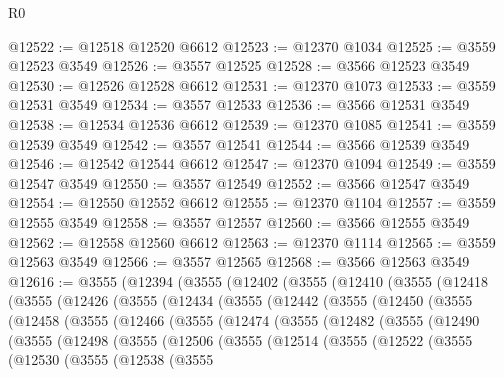 \begin{lexlean}{R0}
\begin{coremodule}
@12522 := @12518 @12520 @6612
@12523 := @12370 @1034
@12525 := @3559 @12523 @3549
@12526 := @3557 @12525
@12528 := @3566 @12523 @3549
@12530 := @12526 @12528 @6612
@12531 := @12370 @1073
@12533 := @3559 @12531 @3549
@12534 := @3557 @12533
@12536 := @3566 @12531 @3549
@12538 := @12534 @12536 @6612
@12539 := @12370 @1085
@12541 := @3559 @12539 @3549
@12542 := @3557 @12541
@12544 := @3566 @12539 @3549
@12546 := @12542 @12544 @6612
@12547 := @12370 @1094
@12549 := @3559 @12547 @3549
@12550 := @3557 @12549
@12552 := @3566 @12547 @3549
@12554 := @12550 @12552 @6612
@12555 := @12370 @1104
@12557 := @3559 @12555 @3549
@12558 := @3557 @12557
@12560 := @3566 @12555 @3549
@12562 := @12558 @12560 @6612
@12563 := @12370 @1114
@12565 := @3559 @12563 @3549
@12566 := @3557 @12565
@12568 := @3566 @12563 @3549
@12616 := @3555
    (@12394
      (@3555
        (@12402
          (@3555
            (@12410
              (@3555
                (@12418
                  (@3555
                    (@12426
                      (@3555
                        (@12434
                          (@3555
                            (@12442
                              (@3555
                                (@12450
                                  (@3555
                                    (@12458
                                      (@3555
                                        (@12466
                                          (@3555
                                            (@12474
                                              (@3555
                                                (@12482
                                                  (@3555
                                                    (@12490
                                                      (@3555
                                                        (@12498
                                                          (@3555
                                                            (@12506
                                                              (@3555
                                                                (@12514
                                                                  (@3555
                                                                    (@12522
                                                                      (@3555
                                                                        (@12530
                                                                          (@3555
                                                                            (@12538
                                                                              (@3555

\end{coremodule}
\end{lexlean}
